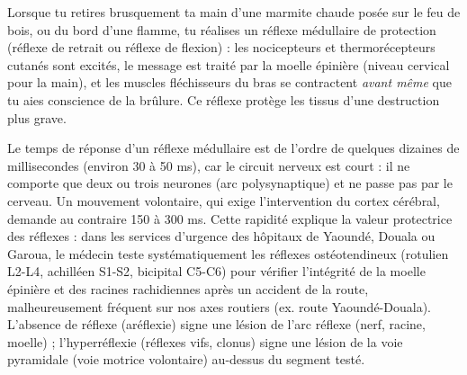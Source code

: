 \documentclass[11pt]{article}
\begin{document}
\begin{exemplebox}
Lorsque tu retires brusquement ta main d'une marmite chaude posée sur le feu de bois, ou du bord d'une flamme, tu réalises un réflexe médullaire de protection (réflexe de retrait ou réflexe de flexion) : les nocicepteurs et thermorécepteurs cutanés sont excités, le message est traité par la moelle épinière (niveau cervical pour la main), et les muscles fléchisseurs du bras se contractent \emph{avant même} que tu aies conscience de la brûlure. Ce réflexe protège les tissus d'une destruction plus grave.
\end{exemplebox}

\begin{savaistu}
Le temps de réponse d'un réflexe médullaire est de l'ordre de quelques dizaines de millisecondes (environ 30 à 50 ms), car le circuit nerveux est court : il ne comporte que deux ou trois neurones (arc polysynaptique) et ne passe pas par le cerveau. Un mouvement volontaire, qui exige l'intervention du cortex cérébral, demande au contraire 150 à 300 ms. Cette rapidité explique la valeur protectrice des réflexes : dans les services d'urgence des hôpitaux de Yaoundé, Douala ou Garoua, le médecin teste systématiquement les réflexes ostéotendineux (rotulien L2-L4, achilléen S1-S2, bicipital C5-C6) pour vérifier l'intégrité de la moelle épinière et des racines rachidiennes après un accident de la route, malheureusement fréquent sur nos axes routiers (ex. route Yaoundé-Douala). L'absence de réflexe (aréflexie) signe une lésion de l'arc réflexe (nerf, racine, moelle) ; l'hyperréflexie (réflexes vifs, clonus) signe une lésion de la voie pyramidale (voie motrice volontaire) au-dessus du segment testé.
\end{savaistu}
\end{document}
